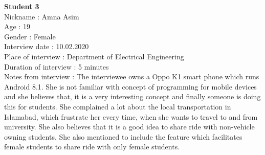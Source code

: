 {\textbf{Student 3}} 
\\ Nickname : Amna Asim 
\\ Age : 19 
\\ Gender : Female 
\\ Interview date : 10.02.2020 
\\ Place of interview : Department of Electrical Engineering
\\ Duration of interview : 5 minutes 
\\ Notes from interview : The interviewee owns a Oppo K1 smart phone which runs Android 8.1. She is not familiar with concept of programming for mobile devices and she believes that, it is a very interesting concept and finally someone is doing this for students. She complained a lot about the local transportation in Islamabad, which frustrate her every time, when she wants to travel to and from university. She also believes that it is a good idea to share ride with non-vehicle owning students. She also mentioned to include the feature which facilitates female students to share ride with only female students.
 